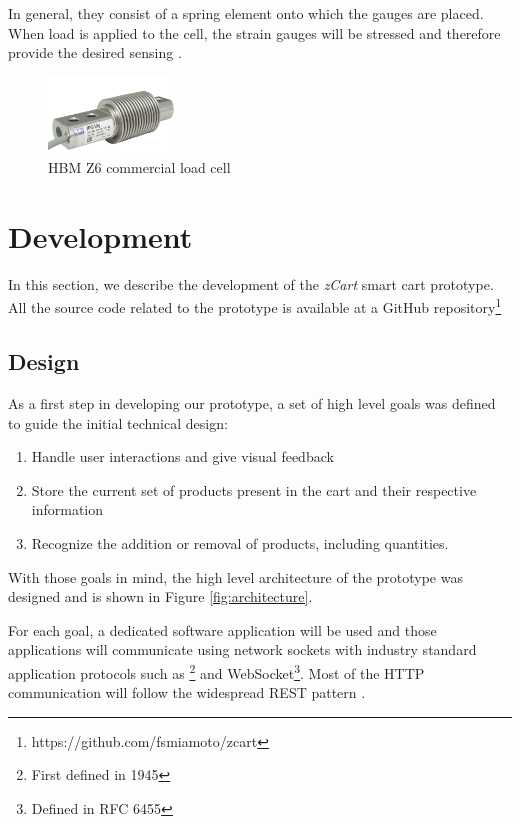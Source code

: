\documentclass[openright]{normas-utf-tex} %
\begin{document}
In general, they consist of a spring element onto which the gauges are placed.
When load is applied to the cell, the strain gauges will be stressed and
therefore provide the desired sensing \cite{HBM2022}.

\begin{figure}[H]
	\centering
	\includegraphics[width=0.3\textwidth]{./images/hbmz6.png}
	\caption[HBM Z6 commercial load cell]{HBM Z6 commercial load cell}
	\label{fig:gauge2}
\end{figure}

\chapter{Development}
\label{chap:desenv}

In this section, we describe the development of the \textit{zCart} smart cart
prototype. All the source code related to the prototype is available at a
GitHub repository\footnote{https://github.com/fsmiamoto/zcart}

\section{Design}
\label{sec:design}

As a first step in developing our prototype, a set of
high level goals was defined to guide the initial technical design:

\begin{enumerate}
    \item Handle user interactions and give visual feedback
    \item Store the current set of products present in the cart and their respective information
    \item Recognize the addition or removal of products, including quantities.
\end{enumerate}

With those goals in mind, the high level architecture of the prototype
was designed and is shown in Figure \ref{fig:architecture}.

For each goal, a dedicated software application will be used and those
applications will communicate using 
network sockets \cite{Kurose2013} with industry standard application protocols such as
\footnote{First defined in
 1945} and WebSocket\footnote{Defined in RFC 6455}.
Most of the HTTP communication will follow the widespread REST pattern \cite{Roy2000}.
\end{document}
